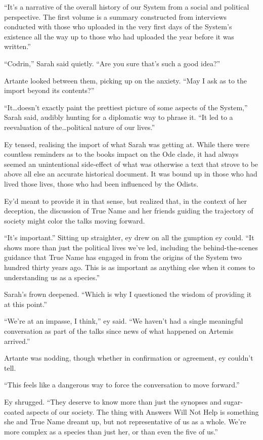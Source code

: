 ``It's a narrative of the overall history of our System from a social and political perspective. The first volume is a summary constructed from interviews conducted with those who uploaded in the very first days of the System's existence all the way up to those who had uploaded the year before it was written.''

``Codrin,'' Sarah said quietly. ``Are you sure that's such a good idea?''

Artante looked between them, picking up on the anxiety. ``May I ask as to the import beyond its contents?''

``It\ldots doesn't exactly paint the prettiest picture of some aspects of the System,'' Sarah said, audibly hunting for a diplomatic way to phrase it. ``It led to a reevaluation of the\ldots political nature of our lives.''

Ey tensed, realising the import of what Sarah was getting at. While there were countless reminders as to the books impact on the Ode clade, it had always seemed an unintentional side-effect of what was otherwise a text that strove to be above all else an accurate historical document. It was bound up in those who had lived those lives, those who had been influenced by the Odists.

Ey'd meant to provide it in that sense, but realized that, in the context of her deception, the discussion of True Name and her friends guiding the trajectory of society might color the talks moving forward.

``It's important.'' Sitting up straighter, ey drew on all the gumption ey could. ``It shows more than just the political lives we've led, including the behind-the-scenes guidance that True Name has engaged in from the origins of the System two hundred thirty years ago. This is as important as anything else when it comes to understanding us as a species.''

Sarah's frown deepened. ``Which is why I questioned the wisdom of providing it at this point.''

``We're at an impasse, I think,'' ey said. ``We haven't had a single meaningful conversation as part of the talks since news of what happened on Artemis arrived.''

Artante was nodding, though whether in confirmation or agreement, ey couldn't tell.

``This feels like a dangerous way to force the conversation to move forward.''

Ey shrugged. ``They deserve to know more than just the synopses and sugar-coated aspects of our society. The thing with Answers Will Not Help is something she and True Name dreamt up, but not representative of us as a whole. We're more complex as a species than just her, or than even the five of us.''

